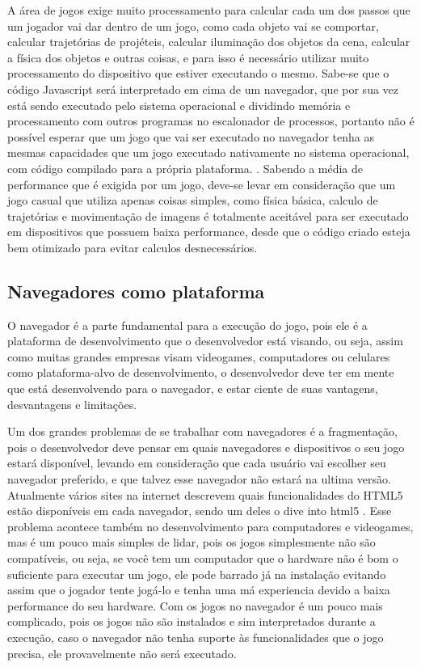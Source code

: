 A área de jogos exige muito processamento para calcular
cada um dos passos que um jogador vai dar dentro de um jogo, como cada
objeto vai se comportar, calcular trajetórias de projéteis, calcular
iluminação dos objetos da cena, calcular a física dos objetos e outras
coisas, e para isso é necessário utilizar muito processamento do
dispositivo que estiver executando o mesmo.
Sabe-se que o código Javascript será interpretado em cima de um
navegador, que por sua vez está sendo
executado pelo sistema operacional e dividindo memória e processamento
com outros programas no escalonador de processos, portanto não
é possível esperar que um jogo que vai ser executado no navegador tenha as mesmas
capacidades que um jogo executado nativamente no sistema
operacional, com código compilado para a própria plataforma.
\cite{flanagan2006javascript}.
Sabendo a média de performance que é exigida por um jogo,
deve-se levar em consideração que um jogo casual que utiliza apenas
coisas simples, como física básica, calculo de trajetórias e
movimentação de imagens é totalmente aceitável para ser executado em
dispositivos que possuem baixa performance, desde que o código criado
esteja bem otimizado para evitar calculos desnecessários.

\subsection{Navegadores como plataforma}

O navegador é a parte fundamental para a execução do jogo, pois
ele é a plataforma de desenvolvimento que o desenvolvedor está visando,
ou seja, assim como muitas grandes empresas visam videogames,
computadores ou celulares como plataforma-alvo de desenvolvimento, o
desenvolvedor deve ter em mente que está desenvolvendo para o
navegador, e estar ciente de suas vantagens, desvantagens e
limitações.

Um dos grandes problemas de se trabalhar com navegadores é a
fragmentação, pois o desenvolvedor deve pensar em quais navegadores e
dispositivos o seu jogo estará disponível, levando em consideração
que cada usuário vai escolher seu navegador preferido, e que talvez
esse navegador não estará na ultima versão. Atualmente vários sites na
internet descrevem quais funcionalidades do HTML5 estão disponíveis em
cada navegador, sendo um deles o dive into html5 \cite{website:diveintohtml5}.
Esse problema acontece também no desenvolvimento para computadores e
videogames, mas é um pouco mais simples de lidar, pois os jogos
simplesmente não são compatíveis, ou seja, se você tem um computador
que o hardware não é bom o suficiente para executar um jogo, ele pode
barrado já na instalação evitando assim que o jogador tente jogá-lo e
tenha uma má experiencia devido a baixa performance do seu hardware.
Com os jogos no navegador é um pouco mais complicado, pois os jogos
não são instalados e sim interpretados durante a execução, caso o navegador não tenha suporte às funcionalidades que o
jogo precisa, ele provavelmente não será executado.

